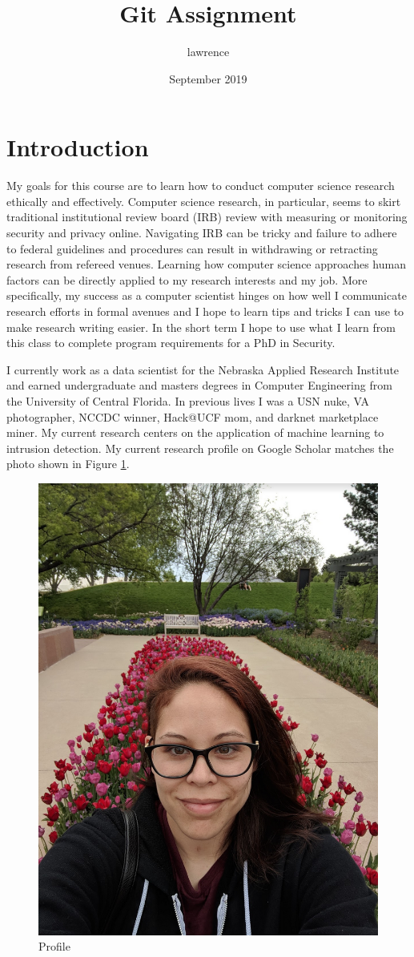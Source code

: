 \documentclass[a4paper,11pt]{article}
\title{Git Assignment}
\author{lawrence}
\date{September 2019}
\begin{document}
\maketitle

\section{Introduction}
My goals for this course are to learn how to conduct computer science research ethically and effectively. Computer science research, in particular, seems to skirt traditional institutional review board (IRB) review with measuring or monitoring security and privacy online. Navigating IRB can be tricky and failure to adhere to federal guidelines and procedures can result in withdrawing or retracting research from refereed venues. Learning how computer science approaches human factors can be directly applied to my research interests and my job. More specifically, my success as a computer scientist hinges on how well I communicate research efforts in formal avenues and I hope to learn tips and tricks I can use to make research writing easier. In the short term I hope to use what I learn from this class to complete program requirements for a PhD in Security.

I currently work as a data scientist for the Nebraska Applied Research Institute and earned undergraduate and masters degrees in Computer Engineering from the University of Central Florida. In previous lives I was a USN nuke, VA photographer, NCCDC winner, Hack@UCF mom, and darknet marketplace miner. My current research centers on the application of machine learning to intrusion detection. My current research profile on Google Scholar matches the photo shown in Figure \ref{fig:profile}.

\begin{figure}[h!]
   \centering
    \includegraphics[width=.35\textwidth]{lawrence.png}
    \caption{Profile}
    \label{fig:profile}
\end{figure}
\end{document}

